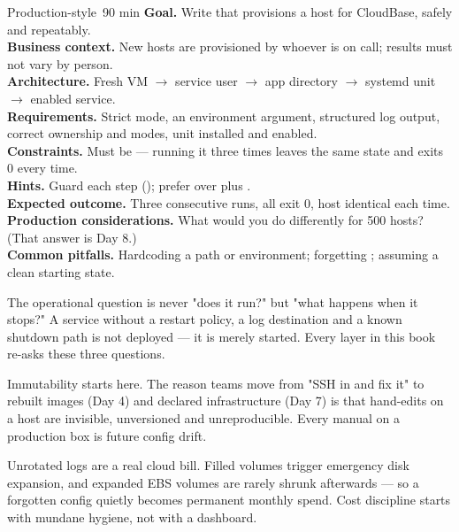 \begin{minilab}{Production-style}{~90 min}
\textbf{Goal.} Write  that provisions a host for CloudBase, safely and repeatably.\\
\textbf{Business context.} New hosts are provisioned by whoever is on call; results must not vary by person.\\
\textbf{Architecture.} Fresh VM $\rightarrow$ service user $\rightarrow$ app directory $\rightarrow$ systemd unit $\rightarrow$ enabled service.\\
\textbf{Requirements.} Strict mode, an environment argument, structured log output, correct ownership and modes, unit installed and enabled.\\
\textbf{Constraints.} Must be  --- running it three times leaves the same state and exits 0 every time.\\
\textbf{Hints.} Guard each step (); prefer  over  plus .\\
\textbf{Expected outcome.} Three consecutive runs, all exit 0, host identical each time.\\
\textbf{Production considerations.} What would you do differently for 500 hosts? (That answer is Day 8.)\\
\textbf{Common pitfalls.} Hardcoding a path or environment; forgetting ; assuming a clean starting state.
\end{minilab}


\begin{opsnote}
The operational question is never "does it run?" but "what happens when it stops?" A service without a restart policy, a log destination and a known shutdown path is not deployed --- it is merely started. Every layer in this book re-asks these three questions.
\end{opsnote}

\begin{infranote}
Immutability starts here. The reason teams move from "SSH in and fix it" to rebuilt images (Day 4) and declared infrastructure (Day 7) is that hand-edits on a host are invisible, unversioned and unreproducible. Every manual  on a production box is future config drift.
\end{infranote}

\begin{costnote}
Unrotated logs are a real cloud bill. Filled volumes trigger emergency disk expansion, and expanded EBS volumes are rarely shrunk afterwards --- so a forgotten  config quietly becomes permanent monthly spend. Cost discipline starts with mundane hygiene, not with a dashboard.
\end{costnote}

